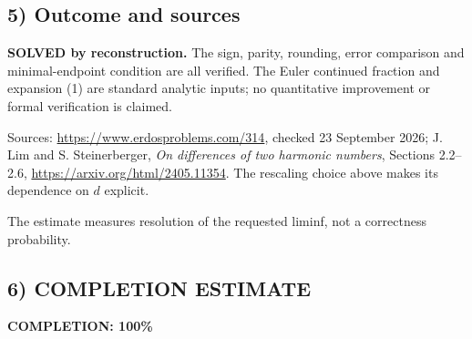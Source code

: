 \subsection*{5) Outcome and sources}
\textbf{SOLVED by reconstruction.} The sign, parity, rounding, error comparison and minimal-endpoint condition are all verified. The Euler continued fraction and expansion (1) are standard analytic inputs; no quantitative improvement or formal verification is claimed.

Sources: \url{https://www.erdosproblems.com/314}, checked 23 September 2026; J. Lim and S. Steinerberger, \emph{On differences of two harmonic numbers}, Sections 2.2--2.6, \url{https://arxiv.org/html/2405.11354}. The rescaling choice above makes its dependence on $d$ explicit.

The estimate measures resolution of the requested liminf, not a correctness probability.
\subsection*{6) COMPLETION ESTIMATE}
\textbf{COMPLETION: 100\%}
